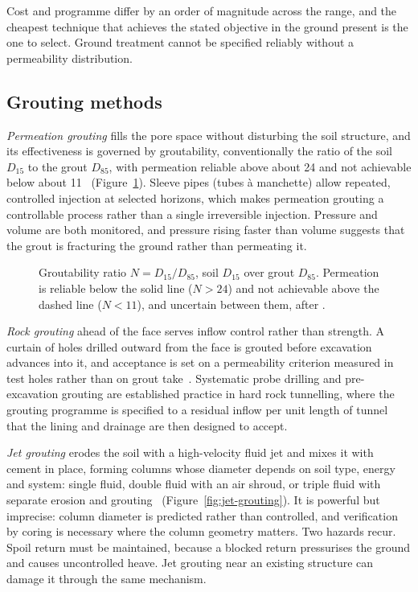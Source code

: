Cost and programme differ by an order of magnitude across the range, and the
cheapest technique that achieves the stated objective in the ground present is
the one to select. Ground treatment cannot be specified reliably without a
permeability distribution.

\subsection{Grouting methods}
\label{sec:grouting-methods}

\emph{Permeation grouting} fills the pore space without disturbing the soil
structure, and its effectiveness is governed by groutability, conventionally
the ratio of the soil $D_{15}$ to the grout $D_{85}$, with permeation reliable
above about 24 and not achievable below about
11~\citep{kirschbell2013ground} (Figure~\ref{fig:groutability}). Sleeve pipes (tubes à manchette) allow
repeated, controlled injection at selected horizons, which makes
permeation grouting a controllable process rather than a single irreversible
injection. Pressure
and volume are both monitored, and pressure rising faster than volume suggests
that the grout is fracturing the ground rather than permeating it.

\begin{figure}[htbp]
\centering
{}
\caption{Groutability ratio $N = D_{15}/D_{85}$, soil $D_{15}$ over grout $D_{85}$. Permeation is reliable below the solid line ($N > 24$) and not achievable above the dashed line ($N < 11$), and uncertain between them, after \citet{kirschbell2013ground}.}
\label{fig:groutability}
\end{figure}

\emph{Rock grouting} ahead of the face serves inflow control rather than
strength. A curtain of holes drilled outward from the face is grouted before
excavation advances into it, and acceptance is set on a permeability criterion
measured in test holes rather than on grout take~\citep{en12715}. Systematic probe drilling
and pre-excavation grouting are established practice in hard rock tunnelling,
where the grouting programme is specified to a residual inflow per unit length
of tunnel that the lining and drainage are then designed to accept.

\emph{Jet grouting} erodes the soil with a high-velocity fluid jet and mixes
it with cement in place, forming columns whose diameter depends on soil type,
energy and system: single fluid, double fluid with an air shroud, or triple
fluid with separate erosion and grouting~\citep{en12716} (Figure~\ref{fig:jet-grouting}). It is powerful but imprecise: column
diameter is predicted rather than controlled, and verification by coring is
necessary where the column geometry matters. Two hazards recur. Spoil return
must be maintained, because a blocked return pressurises the ground and causes
uncontrolled heave. Jet grouting near an existing structure can damage it
through the same mechanism.

